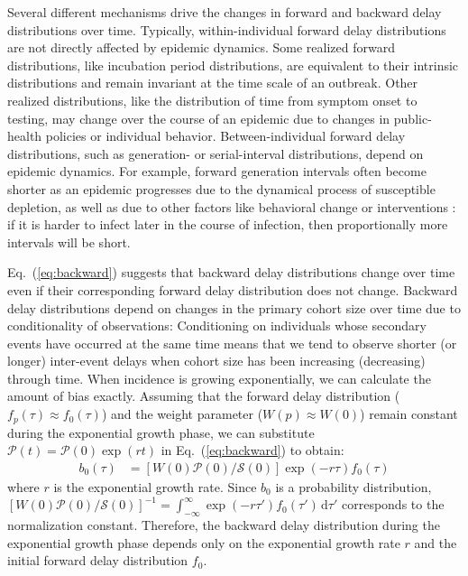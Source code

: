 \documentclass[12pt]{article}
\newcommand{\eref}[1]{Eq.~(\ref{eq:#1})}
\newcommand{\dd}[1]{\ensuremath{\, \mathrm{d}#1}}
\newcommand{\dtau}{\dd{\tau}}
\newcommand{\psymp}{\ensuremath{p}} %
\newcommand{\psize}{{\mathcal P}} %
\newcommand{\ssize}{{\mathcal S}} %
\begin{document}
Several different mechanisms drive the changes in forward and backward delay distributions over time.
Typically, within-individual forward delay distributions are not directly affected by epidemic dynamics.
Some realized forward distributions, like incubation period distributions, are equivalent to their intrinsic distributions and remain invariant at the time scale of an outbreak.
Other realized distributions, like the distribution of time from symptom onset to testing, may change over the course of an epidemic due to changes in public-health policies or individual behavior.
Between-individual forward delay distributions, such as generation- or serial-interval distributions, depend on epidemic dynamics.
For example, forward generation intervals often become shorter as an epidemic progresses due to the dynamical process of susceptible depletion, as well as due to other factors like behavioral change or interventions \citep{kenah2008generation, nishiura2010time, champredon2015intrinsic}: if it is harder to infect later in the course of infection, then proportionally more intervals will be short.

\eref{backward} suggests that backward delay distributions change over time even if their corresponding forward delay distribution does not change.
Backward delay distributions depend on changes in the primary cohort size over time due to conditionality of observations:
Conditioning on individuals whose secondary events have occurred at the same time means that we tend to observe shorter (or longer) inter-event delays when cohort size has been increasing (decreasing) through time.
When incidence is growing exponentially, we can calculate the amount of bias exactly.
Assuming that the forward delay distribution ($f_\psymp(\tau) \approx f_0(\tau)$) and the weight parameter ($W(\psymp) \approx W(0)$) remain constant during the exponential growth phase, we can substitute $\psize(t) = \psize(0) \exp(rt)$ in \eref{backward} to obtain:
\begin{align}
b_0(\tau) &= \left[ W(0) \psize(0)/\ssize(0)\right] \exp(-r\tau) f_0(\tau)
\label{eq:backexp}
\end{align}
where $r$ is the exponential growth rate.
Since $b_0$ is a probability distribution, $\left[W(0) \psize(0)/\ssize(0)\right]^{-1} = \int_{-\infty}^{\infty} \exp(-r\tau') f_0(\tau') \dtau'$ corresponds to the normalization constant.
Therefore, the backward delay distribution during the exponential growth phase depends only on the exponential growth rate $r$ and the initial forward delay distribution $f_0$.
\end{document}

